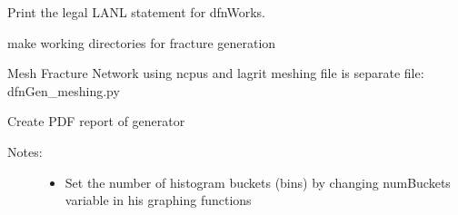 \documentclass[letterpaper,10pt,english]{sphinxmanual}
\begin{document}
\begin{fulllineitems}
\begin{fulllineitems}
\begin{description}
\begin{itemize}
\end{itemize}

\end{description}

\end{fulllineitems}


\begin{fulllineitems}
\label{pydfnworks:pydfnworks.DFNWORKS.legal}
Print the legal LANL statement for dfnWorks.

\end{fulllineitems}


\begin{fulllineitems}
\label{pydfnworks:pydfnworks.DFNWORKS.make_working_directory}
make working directories for fracture generation

\end{fulllineitems}


\begin{fulllineitems}
\label{pydfnworks:pydfnworks.DFNWORKS.mesh_network}
Mesh Fracture Network using ncpus and lagrit
meshing file is separate file: dfnGen\_meshing.py

\end{fulllineitems}


\begin{fulllineitems}
\label{pydfnworks:pydfnworks.DFNWORKS.output_report}
Create PDF report of generator
\begin{description}
\item[{Notes:}] \leavevmode\begin{itemize}
\item {} 
Set the number of histogram buckets (bins) by changing numBuckets variable in his graphing functions


\end{itemize}
\end{description}
\end{fulllineitems}
\end{fulllineitems}
\end{document}
